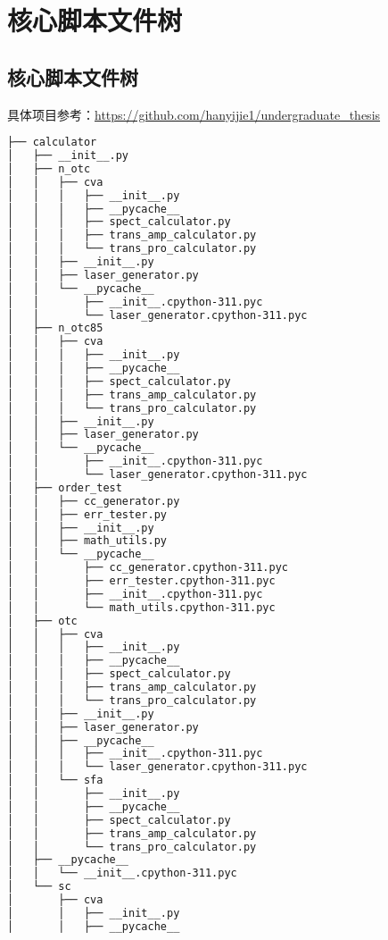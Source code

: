 
\thesisappendix

\chapter{核心脚本文件树}
\section{核心脚本文件树}\label{app:tree}

具体项目参考：\url{https://github.com/hanyijie1/undergraduate_thesis}

\begin{lstlisting}[language=bash, caption={files tree}, label={code:tree_script},
	    extendedchars=true,  % 允许扩展字符集
		inputencoding=utf8x,  % 显式声明UTF-8输入
	]
├── calculator
│   ├── __init__.py
│   ├── n_otc
│   │   ├── cva
│   │   │   ├── __init__.py
│   │   │   ├── __pycache__
│   │   │   ├── spect_calculator.py
│   │   │   ├── trans_amp_calculator.py
│   │   │   └── trans_pro_calculator.py
│   │   ├── __init__.py
│   │   ├── laser_generator.py
│   │   └── __pycache__
│   │       ├── __init__.cpython-311.pyc
│   │       └── laser_generator.cpython-311.pyc
│   ├── n_otc85
│   │   ├── cva
│   │   │   ├── __init__.py
│   │   │   ├── __pycache__
│   │   │   ├── spect_calculator.py
│   │   │   ├── trans_amp_calculator.py
│   │   │   └── trans_pro_calculator.py
│   │   ├── __init__.py
│   │   ├── laser_generator.py
│   │   └── __pycache__
│   │       ├── __init__.cpython-311.pyc
│   │       └── laser_generator.cpython-311.pyc
│   ├── order_test
│   │   ├── cc_generator.py
│   │   ├── err_tester.py
│   │   ├── __init__.py
│   │   ├── math_utils.py
│   │   └── __pycache__
│   │       ├── cc_generator.cpython-311.pyc
│   │       ├── err_tester.cpython-311.pyc
│   │       ├── __init__.cpython-311.pyc
│   │       └── math_utils.cpython-311.pyc
│   ├── otc
│   │   ├── cva
│   │   │   ├── __init__.py
│   │   │   ├── __pycache__
│   │   │   ├── spect_calculator.py
│   │   │   ├── trans_amp_calculator.py
│   │   │   └── trans_pro_calculator.py
│   │   ├── __init__.py
│   │   ├── laser_generator.py
│   │   ├── __pycache__
│   │   │   ├── __init__.cpython-311.pyc
│   │   │   └── laser_generator.cpython-311.pyc
│   │   └── sfa
│   │       ├── __init__.py
│   │       ├── __pycache__
│   │       ├── spect_calculator.py
│   │       ├── trans_amp_calculator.py
│   │       └── trans_pro_calculator.py
│   ├── __pycache__
│   │   └── __init__.cpython-311.pyc
│   └── sc
│       ├── cva
│       │   ├── __init__.py
│       │   ├── __pycache__

\end{lstlisting}
